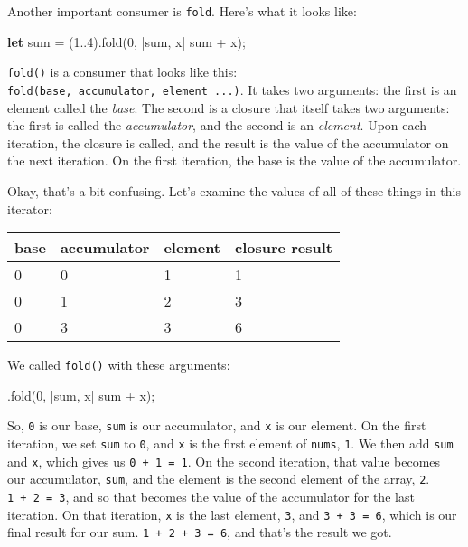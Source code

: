 \documentclass[a4paper,]{book}
\newenvironment{Shaded}{\begin{snugshade}}{\end{snugshade}}
\newcommand{\KeywordTok}[1]{\textcolor[rgb]{0.13,0.29,0.53}{\textbf{{#1}}}}
\newcommand{\DecValTok}[1]{\textcolor[rgb]{0.00,0.00,0.81}{{#1}}}
\newcommand{\NormalTok}[1]{{#1}}
\begin{document}
Another important consumer is \texttt{fold}. Here's what it looks like:

\begin{Shaded}
\begin{Highlighting}[]
\KeywordTok{let} \NormalTok{sum = (}\DecValTok{1.}\NormalTok{.}\DecValTok{4}\NormalTok{).fold(}\DecValTok{0}\NormalTok{, |sum, x| sum + x);}
\end{Highlighting}
\end{Shaded}

\texttt{fold()} is a consumer that looks like this:
\texttt{fold(base,\ \textbar{}accumulator,\ element\textbar{}\ ...)}. It
takes two arguments: the first is an element called the \emph{base}. The
second is a closure that itself takes two arguments: the first is called
the \emph{accumulator}, and the second is an \emph{element}. Upon each
iteration, the closure is called, and the result is the value of the
accumulator on the next iteration. On the first iteration, the base is
the value of the accumulator.

Okay, that's a bit confusing. Let's examine the values of all of these
things in this iterator:

\begin{longtable}[c]{@{}llll@{}}
\toprule
base & accumulator & element & closure result\tabularnewline
\midrule
\endhead
0 & 0 & 1 & 1\tabularnewline
0 & 1 & 2 & 3\tabularnewline
0 & 3 & 3 & 6\tabularnewline
\bottomrule
\end{longtable}

We called \texttt{fold()} with these arguments:

\begin{Shaded}
\begin{Highlighting}[]
\NormalTok{.fold(}\DecValTok{0}\NormalTok{, |sum, x| sum + x);}
\end{Highlighting}
\end{Shaded}

So, \texttt{0} is our base, \texttt{sum} is our accumulator, and
\texttt{x} is our element. On the first iteration, we set \texttt{sum}
to \texttt{0}, and \texttt{x} is the first element of \texttt{nums},
\texttt{1}. We then add \texttt{sum} and \texttt{x}, which gives us
\texttt{0\ +\ 1\ =\ 1}. On the second iteration, that value becomes our
accumulator, \texttt{sum}, and the element is the second element of the
array, \texttt{2}. \texttt{1\ +\ 2\ =\ 3}, and so that becomes the value
of the accumulator for the last iteration. On that iteration, \texttt{x}
is the last element, \texttt{3}, and \texttt{3\ +\ 3\ =\ 6}, which is
our final result for our sum. \texttt{1\ +\ 2\ +\ 3\ =\ 6}, and that's
the result we got.
\end{document}
